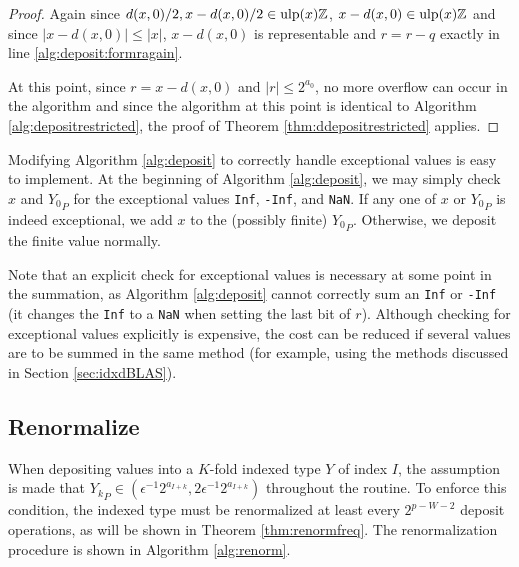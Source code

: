 \begin{proof}
        Again since $d(x, 0)/2, x - d(x, 0)/2 \in \text{ulp}(x)\mathbb{Z}$, $x - d(x, 0) \in \text{ulp}(x)\mathbb{Z}$ and since $|x - d(x, 0)| \leq |x|$, $x - d(x, 0)$ is representable and $r=r-q$ exactly in line \ref{alg:deposit:formragain}.

        At this point, since $r = x - d(x, 0)$ and $|r| \leq 2^{a_0}$, no more overflow can occur in the algorithm and since the algorithm at this point is identical to Algorithm \ref{alg:depositrestricted}, the proof of Theorem \ref{thm:ddepositrestricted} applies.
      \end{proof}

      Modifying Algorithm \ref{alg:deposit} to correctly handle exceptional values is easy to implement. At the beginning of Algorithm \ref{alg:deposit}, we may simply check $x$ and ${Y_0}_P$ for the exceptional values \texttt{Inf}, \texttt{-Inf}, and \texttt{NaN}. If any one of $x$ or ${Y_0}_P$ is indeed exceptional, we add $x$ to the (possibly finite) ${Y_0}_P$. Otherwise, we deposit the finite value normally.

      Note that an explicit check for exceptional values is necessary at some point in the summation, as Algorithm \ref{alg:deposit} cannot correctly sum an \texttt{Inf} or \texttt{-Inf} (it changes the \texttt{Inf} to a \texttt{NaN} when setting the last bit of $r$). Although checking for exceptional values explicitly is expensive, the cost can be reduced if several values are to be summed in the same method (for example, using the methods discussed in Section \ref{sec:idxdBLAS}).



  \subsection{Renormalize}
    \label{sec:primitiveops_renormalize}
    When depositing values into a $K$-fold indexed type $Y$ of index $I$, the assumption is made that ${Y_k}_P \in (\epsilon^{-1} 2^{a_{I + k}}, 2  \epsilon^{-1} 2^{a_{I + k}})$ throughout the routine. To enforce this condition, the indexed type must be renormalized at least every $2^{p - W - 2}$ deposit operations, as will be shown in Theorem \ref{thm:renormfreq}. The renormalization procedure is shown in Algorithm \ref{alg:renorm}.

